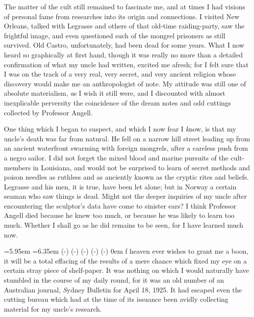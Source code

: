 The matter of the cult still remained to fascinate me, and at times I had visions of personal fame from researches into its origin and connections. I visited New Orleans, talked with Legrasse and others of that old-time raiding-party, saw the frightful image, and even questioned such of the mongrel prisoners as still survived. Old Castro, unfortunately, had been dead for some years. What I now heard so graphically at first hand, though it was really no more than a detailed confirmation of what my uncle had written, excited me afresh; for I felt sure that I was on the track of a very real, very secret, and very ancient religion whose discovery would make me an anthropologist of note. My attitude was still one of absolute materialism, {\emph as I wish it still were}, and I discounted with almost inexplicable perversity the coincidence of the dream notes and odd cuttings collected by Professor Angell.

One thing which I began to suspect, and which I now fear I {\emph know}, is that my uncle’s death was far from natural. He fell on a narrow hill street leading up from an ancient waterfront swarming with foreign mongrels, after a careless push from a negro sailor. I did not forget the mixed blood and marine pursuits of the cult-members in Louisiana, and would not be surprised to learn of secret methods and poison needles as ruthless and as anciently known as the cryptic rites and beliefs. Legrasse and his men, it is true, have been let alone; but in Norway a certain seaman who saw things is dead. Might not the deeper inquiries of my uncle after encountering the sculptor’s data have come to sinister ears? I think Professor Angell died because he knew too much, or because he was likely to learn too much. Whether I shall go as he did remains to be seen, for I have learned much now.
\endchapter


\baselineskip
\noindent\leavevmode
{}
\baselineskip
{}=5.95em
=6.35em
	 \dimexpr(\hsize-)
	 \dimexpr(\hsize-)
	 \dimexpr(\hsize-)
	 \dimexpr(\hsize-)
	 \dimexpr(\hsize-)
	0em \hsize
\noindent
{\sc f heaven ever} wishes to grant me a boon, it will be a total effacing of the results of a mere chance which fixed my eye on a certain stray piece of shelf-paper. It was nothing on which I would naturally have stumbled in the course of my daily round, for it was an old number of an Australian journal, {\emph Sydney Bulletin} for April 18, 1925. It had escaped even the cutting bureau which had at the time of its issuance been avidly collecting material for my uncle’s research.

